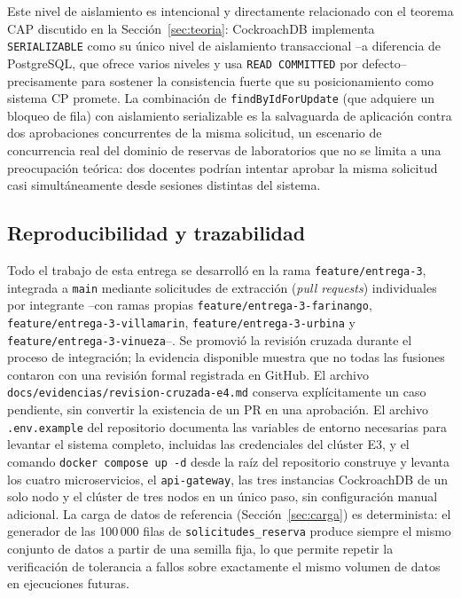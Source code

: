 \documentclass[10pt,twocolumn]{article}
\begin{document}
Este nivel de aislamiento es intencional y directamente relacionado con el
teorema CAP discutido en la Sección~\ref{sec:teoria}: CockroachDB
implementa \texttt{SERIALIZABLE} como su único nivel de aislamiento
transaccional --a diferencia de PostgreSQL, que ofrece varios niveles y usa
\texttt{READ COMMITTED} por defecto-- precisamente para sostener la
consistencia fuerte que su posicionamiento como sistema CP promete. La
combinación de \texttt{findByIdForUpdate} (que adquiere un bloqueo de fila)
con aislamiento serializable es la salvaguarda de aplicación contra dos
aprobaciones concurrentes de la misma solicitud, un escenario de
concurrencia real del dominio de reservas de laboratorios que no se limita
a una preocupación teórica: dos docentes podrían intentar aprobar la misma
solicitud casi simultáneamente desde sesiones distintas del sistema.

\subsection{Reproducibilidad y trazabilidad}

Todo el trabajo de esta entrega se desarrolló en la rama
\texttt{feature/entrega-3}, integrada a \texttt{main} mediante solicitudes
de extracción (\emph{pull requests}) individuales por integrante --con
ramas propias \texttt{feature/entrega-3-farinango},
\texttt{feature/entrega-3-villamarin}, \texttt{feature/entrega-3-urbina} y
\texttt{feature/entrega-3-vinueza}--. Se promovió la revisión cruzada durante
el proceso de integración; la evidencia disponible muestra que no todas las
fusiones contaron con una revisión formal registrada en GitHub. El archivo
\texttt{docs/evidencias/revision-cruzada-e4.md} conserva explícitamente un
caso pendiente, sin convertir la existencia de un PR en una aprobación. El
archivo \texttt{.env.example} del repositorio documenta las
variables de entorno necesarias para levantar el sistema completo,
incluidas las credenciales del clúster E3, y el comando
\texttt{docker compose up -d} desde la raíz del repositorio construye y
levanta los cuatro microservicios, el \texttt{api-gateway}, las tres
instancias CockroachDB de un solo nodo y el clúster de tres nodos en un
único paso, sin configuración manual adicional. La carga de datos de
referencia (Sección~\ref{sec:carga}) es determinista: el generador de las
100\,000 filas de \texttt{solicitudes\_reserva} produce siempre el mismo
conjunto de datos a partir de una semilla fija, lo que permite repetir la
verificación de tolerancia a fallos sobre exactamente el mismo volumen de
datos en ejecuciones futuras.
\end{document}
